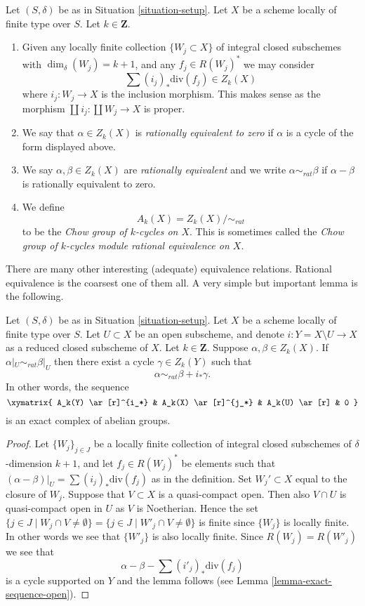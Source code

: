 \begin{definition}
\label{definition-rational-equivalence}
Let $(S, \delta)$ be as in Situation \ref{situation-setup}.
Let $X$ be a scheme locally of finite type over $S$.
Let $k \in \mathbf{Z}$.
\begin{enumerate}
\item Given any locally finite collection $\{W_j \subset X\}$
of integral closed subschemes with $\dim_\delta(W_j) = k + 1$,
and any $f_j \in R(W_j)^*$ we may consider
$$
\sum (i_j)_*\text{div}(f_j) \in Z_k(X)
$$
where $i_j : W_j \to X$ is the inclusion morphism.
This makes sense as the morphism
$\coprod i_j : \coprod W_j \to X$ is proper.
\item We say that $\alpha \in Z_k(X)$ is {\it rationally equivalent to zero}
if $\alpha$ is a cycle of the form displayed above.
\item We say $\alpha, \beta \in Z_k(X)$ are
{\it rationally equivalent} and we write $\alpha \sim_{rat} \beta$
if $\alpha - \beta$ is rationally equivalent to zero.
\item We define
$$
A_k(X) = Z_k(X) / \sim_{rat}
$$
to be the {\it Chow group of $k$-cycles on $X$}. This is sometimes called
the {\it Chow group of $k$-cycles module rational equivalence on $X$}.
\end{enumerate}
\end{definition}

\noindent
There are many other interesting (adequate) equivalence relations.
Rational equivalence is the coarsest one of them all.
A very simple but important lemma is the following.

\begin{lemma}
\label{lemma-restrict-to-open}
Let $(S, \delta)$ be as in Situation \ref{situation-setup}.
Let $X$ be a scheme locally of finite type over $S$.
Let $U \subset X$ be an open subscheme, and denote
$i : Y = X \setminus U \to X$ as a reduced closed subscheme of $X$.
Let $k \in \mathbf{Z}$.
Suppose $\alpha, \beta \in Z_k(X)$.
If $\alpha|_U \sim_{rat} \beta|_U$ then there exist a cycle
$\gamma \in Z_k(Y)$ such that
$$
\alpha \sim_{rat} \beta + i_*\gamma.
$$
In other words, the sequence
$$
\xymatrix{
A_k(Y) \ar[r]^{i_*} & A_k(X) \ar[r]^{j_*} & A_k(U) \ar[r] & 0
}
$$
is an exact complex of abelian groups.
\end{lemma}

\begin{proof}
Let $\{W_j\}_{j \in J}$ be a locally finite collection of integral closed
subschemes of $\delta$-dimension $k + 1$, and let $f_j \in R(W_j)^*$
be elements such that $(\alpha - \beta)|_U = \sum (i_j)_*\text{div}(f_j)$
as in the definition. Set $W_j' \subset X$ equal
to the closure of $W_j$. Suppose that $V \subset X$ is a quasi-compact
open. Then also $V \cap U$ is quasi-compact open in $U$ as
$V$ is Noetherian. Hence the set
$\{j \in J \mid W_j \cap V \not = \emptyset\}
= \{j \in J \mid W'_j \cap V \not = \emptyset\}$
is finite since $\{W_j\}$ is locally finite. In other words we see that
$\{W'_j\}$ is also locally finite. Since $R(W_j) = R(W'_j)$ we see
that
$$
\alpha - \beta - \sum (i'_j)_*\text{div}(f_j)
$$
is a cycle supported on $Y$ and the lemma follows (see
Lemma \ref{lemma-exact-sequence-open}).
\end{proof}

